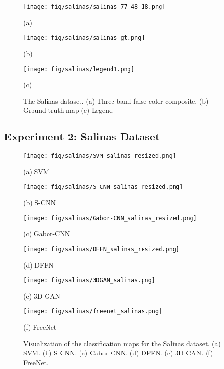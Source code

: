 \documentclass[journal]{IEEEtran}
\begin{document}
\begin{figure}[hbt]
  \begin{minipage}[b]{.30\linewidth}
    \centering
    \texttt{[image: fig/salinas/salinas\_77\_48\_18.png]}
    \centerline{(a)}
  \end{minipage}
  \hfill
  \begin{minipage}[b]{0.30\linewidth}
    \centering
    \texttt{[image: fig/salinas/salinas\_gt.png]}
    \centerline{(b)}
  \end{minipage}
  \hfill
  \begin{minipage}[b]{0.25\linewidth}
    \centering
    \texttt{[image: fig/salinas/legend1.png]}
    \centerline{(c)}
  \end{minipage}
  \caption{The Salinas dataset.
    (a) Three-band false color composite.
    (b) Ground truth map
    (c) Legend}
  \label{fig:salinas}
\end{figure}
\subsection{Experiment 2: Salinas Dataset}
\begin{figure*}[htb]
  \begin{minipage}[b]{0.15\linewidth}
    \centering
    \texttt{[image: fig/salinas/SVM\_salinas\_resized.png]}
    \centerline{(a) SVM}
  \end{minipage}
  \hfill
  \hspace{4pt}
  \begin{minipage}[b]{0.15\linewidth}
    \centering
    \texttt{[image: fig/salinas/S-CNN\_salinas\_resized.png]}
    \centerline{(b) S-CNN}
  \end{minipage}
  \hfill
  \hspace{4pt}
  \begin{minipage}[b]{0.15\linewidth}
    \centering
    \texttt{[image: fig/salinas/Gabor-CNN\_salinas\_resized.png]}
    \centerline{(c) Gabor-CNN}
  \end{minipage}
  \hfill
  \hspace{4pt}
  \begin{minipage}[b]{0.15\linewidth}
    \centering
    \texttt{[image: fig/salinas/DFFN\_salinas\_resized.png]}
    \centerline{(d) DFFN}
  \end{minipage}
  \hfill
  \hspace{4pt}
  \begin{minipage}[b]{0.15\linewidth}
    \centering
    \texttt{[image: fig/salinas/3DGAN\_salinas.png]}
    \centerline{(e) 3D-GAN}
  \end{minipage}
  \hfill
  \hspace{4pt}
  \begin{minipage}[b]{0.15\linewidth}
    \centering
    \texttt{[image: fig/salinas/freenet\_salinas.png]}
    \centerline{(f) FreeNet}
  \end{minipage}
  \caption{Visualization of the classification maps for the Salinas dataset.
    (a) SVM. (b) S-CNN. (c) Gabor-CNN. (d) DFFN. (e) 3D-GAN. (f) FreeNet.}
  \label{fig:vis_salinas}
\end{figure*}
\end{document}
